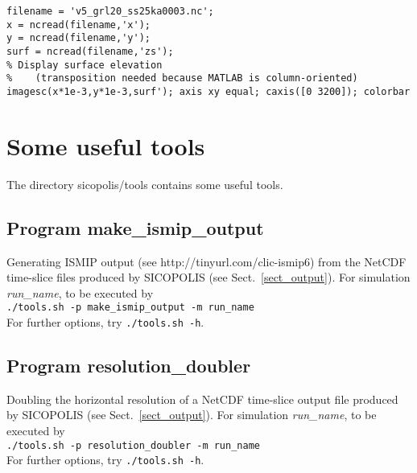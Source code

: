 \documentclass[12pt,a4paper]{article}
\begin{document}
\noindent\hspace*{5mm}\verb+filename = 'v5_grl20_ss25ka0003.nc';+
\\[-0.5ex]
\hspace*{5mm}\verb+x = ncread(filename,'x');+
\\[-0.5ex]
\hspace*{5mm}\verb+y = ncread(filename,'y');+
\\[-0.5ex]
\hspace*{5mm}\verb+surf = ncread(filename,'zs');+
\\[-0.5ex]
\hspace*{5mm}\verb+% Display surface elevation+
\\[-0.5ex]
\hspace*{5mm}\verb+%    (transposition needed because MATLAB is column-oriented)+
\\[-0.5ex]
\hspace*{5mm}\verb+imagesc(x*1e-3,y*1e-3,surf'); axis xy equal; caxis([0 3200]); colorbar+



\section{Some useful tools}
\label{sect_tools}

The directory sicopolis/tools contains some useful tools.

\subsection{Program make\_ismip\_output}
\label{ssect_make_ismip_output}

Generating ISMIP output (see http://tinyurl.com/clic-ismip6) from the NetCDF time-slice files produced by SICOPOLIS (see Sect.~\ref{sect_output}). For simulation \emph{run\_name}, to be executed by\\
\hspace*{10mm}\verb+./tools.sh -p make_ismip_output -m run_name+\\
For further options, try \verb+./tools.sh -h+.

\subsection{Program resolution\_doubler}
\label{ssect_resolution_doubler}

Doubling the horizontal resolution of a NetCDF time-slice output file produced by SICOPOLIS (see Sect.~\ref{sect_output}). For simulation \emph{run\_name}, to be executed by\\
\hspace*{10mm}\verb+./tools.sh -p resolution_doubler -m run_name+\\
For further options, try \verb+./tools.sh -h+.
\end{document}
